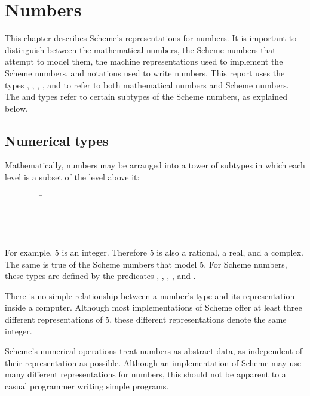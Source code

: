 \chapter{Numbers}
\label{numbertypeschapter}

This chapter describes Scheme's representations for numbers.
It is important to distinguish between the mathematical numbers, the
Scheme numbers that attempt to model them, the machine representations
used to implement the Scheme numbers, and notations used to write numbers.
This report uses the types , , ,
, and  to refer to both mathematical numbers
and Scheme numbers.
The  and  types refer to certain
subtypes of the Scheme numbers, as explained below.

\section{Numerical types}
\label{numericaltypes}

\vest Mathematically, numbers may be arranged into a tower of subtypes
in which each level is a subset of the level above it:
\begin{tabbing}
\ \ \ \ \ \ \ \ \ \= \\
\>  \\
\>  \\
\>  \\
\>  
\end{tabbing}

For example, 5 is an integer.  Therefore 5 is also a rational,
a real, and a complex.  The same is true of the Scheme numbers
that model 5.  For Scheme numbers, these types are defined by the
predicates , , , ,
and .

There is no simple relationship between a number's type and its
representation inside a computer.  Although most implementations of
Scheme offer at least three different representations of 5, these
different representations denote the same integer.

Scheme's numerical operations treat numbers as abstract data, as
independent of their representation as possible.  Although an implementation
of Scheme may use many different representations for
numbers, this should not be apparent to a casual programmer writing
simple programs.

